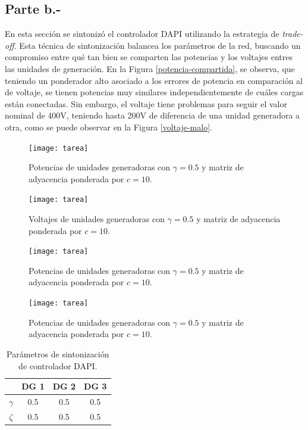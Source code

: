 \subsection{Parte b.-}

En esta sección se sintonizó el controlador DAPI utilizando la estrategia de \textit{trade-off}. Esta técnica de sintonización balancea los parámetros de la red, buscando un compromiso entre qué tan bien se comparten las potencias y los voltajes entres las unidades de generación. En la Figura \ref{potencia-compartida}, se observa, que teniendo un ponderador alto asociado a los errores de potencia en comparación al de voltaje, se tienen potencias muy similares independientemente de cuáles cargas están conectadas. Sin embargo, el voltaje tiene problemas para seguir el valor nominal de 400V, teniendo hasta 200V de diferencia de una unidad generadora a otra, como se puede observar en la Figura \ref{voltaje-malo}.
\begin{figure}
    \centering
    \texttt{[image: tarea]}
    \caption{Potencias de unidades generadoras con $\gamma = 0.5$ y matriz de adyacencia ponderada por $c = 10$.}
    \label{fig:enter-label}
\end{figure}

\begin{figure}
    \centering
    \texttt{[image: tarea]}
    \caption{Voltajes de unidades generadoras con $\gamma = 0.5$ y matriz de adyacencia ponderada por $c = 10$.}
    \label{fig:enter-label}
\end{figure}

\begin{figure}
    \centering
    \texttt{[image: tarea]}
    \caption{Potencias de unidades generadoras con $\gamma = 0.5$ y matriz de adyacencia ponderada por $c = 10$.}
    \label{fig:enter-label}
\end{figure}

\begin{figure}
    \centering
    \texttt{[image: tarea]}
    \caption{Potencias de unidades generadoras con $\gamma = 0.5$ y matriz de adyacencia ponderada por $c = 10$.}
    \label{fig:enter-label}
\end{figure}


\begin{table}[h!]
\centering
\begin{tabular}{|c|c|c|c|}
\hline
 & DG 1 & DG 2 & DG 3 \\ 
\hline
$\gamma$ & 0.5 & 0.5 & 0.5 \\ 
\hline
$\zeta$  & 0.5 & 0.5 & 0.5 \\ 
\hline
\end{tabular}
\caption{Parámetros de sintonización de controlador DAPI.}
\label{parametros_dapi}
\end{table}


